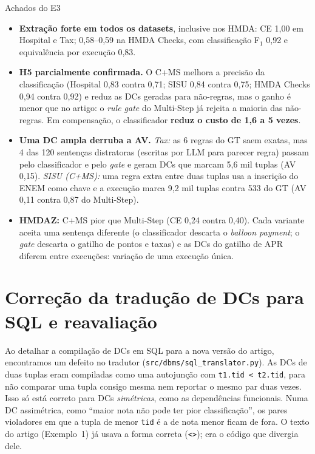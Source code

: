 \documentclass[11pt,a4paper]{article}
\begin{document}
\begin{achado}{Achados do E3}
\begin{itemize}
  \item \textbf{Extração forte em todos os datasets}, inclusive nos HMDA: CE 1,00 em Hospital e Tax; 0,58--0,59
        na HMDA Checks, com classificação F$_1$ 0,92 e equivalência por execução 0,83.
  \item \textbf{H5 parcialmente confirmada.} O C+MS melhora a precisão da classificação (Hospital 0,83 contra
        0,71; SISU 0,84 contra 0,75; HMDA Checks 0,94 contra 0,92) e reduz as DCs geradas para não-regras, mas o
        ganho é menor que no artigo: o \emph{rule gate} do Multi-Step já rejeita a maioria das não-regras. Em
        compensação, o classificador \textbf{reduz o custo de 1,6 a 5 vezes}.
  \item \textbf{Uma DC ampla derruba a AV.} \emph{Tax:} as 6 regras do GT saem exatas, mas 4 das 120 sentenças
        distratoras (escritas por LLM para parecer regra) passam pelo classificador e pelo \emph{gate} e geram DCs
        que marcam 5,6 mil tuplas (AV 0,15). \emph{SISU (C+MS):} uma regra extra entre duas tuplas usa a inscrição do
        ENEM como chave e a execução marca 9,2 mil tuplas contra 533 do GT (AV 0,11 contra 0,87 do Multi-Step).
  \item \textbf{HMDAZ:} C+MS pior que Multi-Step (CE 0,24 contra 0,40). Cada variante aceita uma sentença
        diferente (o classificador descarta o \emph{balloon payment}; o \emph{gate} descarta o gatilho de pontos e
        taxas) e as DCs do gatilho de APR diferem entre execuções: variação de uma execução única.
\end{itemize}
\end{achado}

\section{Correção da tradução de DCs para SQL e reavaliação}
\label{sec:pares}

Ao detalhar a compilação de DCs em SQL para a nova versão do artigo, encontramos um defeito no tradutor
(\texttt{src/dbms/sql\_translator.py}). As DCs de duas tuplas eram compiladas como uma autojunção com
\texttt{t1.tid < t2.tid}, para não comparar uma tupla consigo mesma nem reportar o mesmo par duas vezes. Isso só
está correto para DCs \emph{simétricas}, como as dependências funcionais. Numa DC assimétrica, como
``maior nota não pode ter pior classificação'', os pares violadores em que a tupla de menor \texttt{tid} é a de
nota menor ficam de fora. O texto do artigo (Exemplo~1) já usava a forma correta (\texttt{<>}); era o código que
divergia dele.
\end{document}
